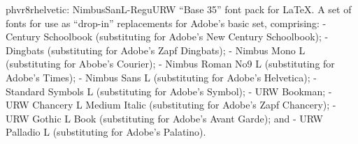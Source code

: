 \documentclass{ddltxtyp}
\begin{document}
\begin{package}{phvr8r}{helvetic: NimbusSanL-Regu}{URW ``Base 35'' font pack for {\LaTeX}.}
A set of fonts for use as ``drop-in'' replacements for Adobe's
basic set, comprising: - Century Schoolbook (substituting for
Adobe's New Century Schoolbook); - Dingbats (substituting for
Adobe's Zapf Dingbats); - Nimbus Mono L (substituting for
Abobe's Courier); - Nimbus Roman No9 L (substituting for
Adobe's Times); - Nimbus Sans L (substituting for Adobe's
Helvetica); - Standard Symbols L (substituting for Adobe's
Symbol); - URW Bookman; - URW Chancery L Medium Italic
(substituting for Adobe's Zapf Chancery); - URW Gothic L Book
(substituting for Adobe's Avant Garde); and - URW Palladio L
(substituting for Adobe's Palatino).
\end{package}
\end{document}
